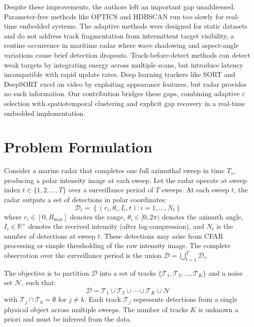 \documentclass[conf]{new-aiaa}
\begin{document}
Despite these improvements, the authors left an important gap unaddressed. Parameter-free methods like OPTICS and HDBSCAN run too slowly for real-time embedded systems. The adaptive methods were designed for static datasets and do not address track fragmentation from intermittent target visibility, a routine occurrence in maritime radar where wave shadowing and aspect-angle variations cause brief detection dropouts. Track-before-detect methods \cite{Davey2008} can detect weak targets by integrating energy across multiple scans, but introduce latency incompatible with rapid update rates. Deep learning trackers like SORT \cite{Bewley2016} and DeepSORT \cite{Wojke2017} excel on video by exploiting appearance features, but radar provides no such information. Our contribution bridges these gaps, combining adaptive $\varepsilon$ selection with spatiotemporal clustering and explicit gap recovery in a real-time embedded implementation.

\section{Problem Formulation}

Consider a marine radar that completes one full azimuthal sweep in time $T_s$, producing a polar intensity image at each sweep. Let the radar operate at sweep index $t \in \{1, 2, \ldots, T\}$ over a surveillance period of $T$ sweeps. At each sweep $t$, the radar outputs a set of detections in polar coordinates:
\begin{equation}
    \mathcal{D}_t = \left\{ (r_i, \theta_i, I_i, t) : i = 1, \ldots, N_t \right\}
\end{equation}
where $r_i \in [0, R_{\max}]$ denotes the range, $\theta_i \in [0, 2\pi)$ denotes the azimuth angle, $I_i \in \mathbb{R}^+$ denotes the received intensity (after log-compression), and $N_t$ is the number of detections at sweep $t$. These detections may arise from CFAR processing or simple thresholding of the raw intensity image. The complete observation over the surveillance period is the union $\mathcal{D} = \bigcup_{t=1}^{T} \mathcal{D}_t$.

The objective is to partition $\mathcal{D}$ into a set of tracks $\{\mathcal{T}_1, \mathcal{T}_2, \ldots, \mathcal{T}_K\}$ and a noise set $\mathcal{N}$, such that:
\begin{equation}
    \mathcal{D} = \mathcal{T}_1 \cup \mathcal{T}_2 \cup \cdots \cup \mathcal{T}_K \cup \mathcal{N}
\end{equation}
with $\mathcal{T}_j \cap \mathcal{T}_k = \emptyset$ for $j \neq k$. Each track $\mathcal{T}_j$ represents detections from a single physical object across multiple sweeps. The number of tracks $K$ is unknown a priori and must be inferred from the data.
\end{document}
